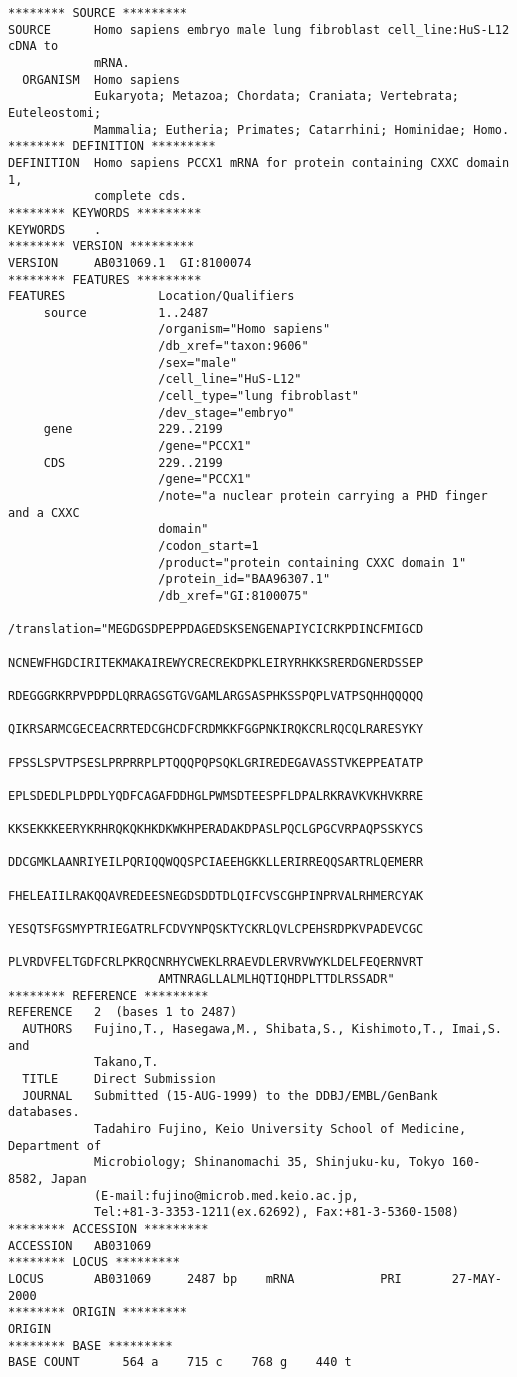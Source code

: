 \begin{lstlisting}
******** SOURCE *********
SOURCE      Homo sapiens embryo male lung fibroblast cell_line:HuS-L12 cDNA to
            mRNA.
  ORGANISM  Homo sapiens
            Eukaryota; Metazoa; Chordata; Craniata; Vertebrata; Euteleostomi;
            Mammalia; Eutheria; Primates; Catarrhini; Hominidae; Homo.
******** DEFINITION *********
DEFINITION  Homo sapiens PCCX1 mRNA for protein containing CXXC domain 1,
            complete cds.
******** KEYWORDS *********
KEYWORDS    .
******** VERSION *********
VERSION     AB031069.1  GI:8100074
******** FEATURES *********
FEATURES             Location/Qualifiers
     source          1..2487
                     /organism="Homo sapiens"
                     /db_xref="taxon:9606"
                     /sex="male"
                     /cell_line="HuS-L12"
                     /cell_type="lung fibroblast"
                     /dev_stage="embryo"
     gene            229..2199
                     /gene="PCCX1"
     CDS             229..2199
                     /gene="PCCX1"
                     /note="a nuclear protein carrying a PHD finger and a CXXC
                     domain"
                     /codon_start=1
                     /product="protein containing CXXC domain 1"
                     /protein_id="BAA96307.1"
                     /db_xref="GI:8100075"
                     /translation="MEGDGSDPEPPDAGEDSKSENGENAPIYCICRKPDINCFMIGCD
                     NCNEWFHGDCIRITEKMAKAIREWYCRECREKDPKLEIRYRHKKSRERDGNERDSSEP
                     RDEGGGRKRPVPDPDLQRRAGSGTGVGAMLARGSASPHKSSPQPLVATPSQHHQQQQQ
                     QIKRSARMCGECEACRRTEDCGHCDFCRDMKKFGGPNKIRQKCRLRQCQLRARESYKY
                     FPSSLSPVTPSESLPRPRRPLPTQQQPQPSQKLGRIREDEGAVASSTVKEPPEATATP
                     EPLSDEDLPLDPDLYQDFCAGAFDDHGLPWMSDTEESPFLDPALRKRAVKVKHVKRRE
                     KKSEKKKEERYKRHRQKQKHKDKWKHPERADAKDPASLPQCLGPGCVRPAQPSSKYCS
                     DDCGMKLAANRIYEILPQRIQQWQQSPCIAEEHGKKLLERIRREQQSARTRLQEMERR
                     FHELEAIILRAKQQAVREDEESNEGDSDDTDLQIFCVSCGHPINPRVALRHMERCYAK
                     YESQTSFGSMYPTRIEGATRLFCDVYNPQSKTYCKRLQVLCPEHSRDPKVPADEVCGC
                     PLVRDVFELTGDFCRLPKRQCNRHYCWEKLRRAEVDLERVRVWYKLDELFEQERNVRT
                     AMTNRAGLLALMLHQTIQHDPLTTDLRSSADR"
******** REFERENCE *********
REFERENCE   2  (bases 1 to 2487)
  AUTHORS   Fujino,T., Hasegawa,M., Shibata,S., Kishimoto,T., Imai,S. and
            Takano,T.
  TITLE     Direct Submission
  JOURNAL   Submitted (15-AUG-1999) to the DDBJ/EMBL/GenBank databases.
            Tadahiro Fujino, Keio University School of Medicine, Department of
            Microbiology; Shinanomachi 35, Shinjuku-ku, Tokyo 160-8582, Japan
            (E-mail:fujino@microb.med.keio.ac.jp,
            Tel:+81-3-3353-1211(ex.62692), Fax:+81-3-5360-1508)
******** ACCESSION *********
ACCESSION   AB031069
******** LOCUS *********
LOCUS       AB031069     2487 bp    mRNA            PRI       27-MAY-2000
******** ORIGIN *********
ORIGIN      
******** BASE *********
BASE COUNT      564 a    715 c    768 g    440 t
\end{lstlisting}

